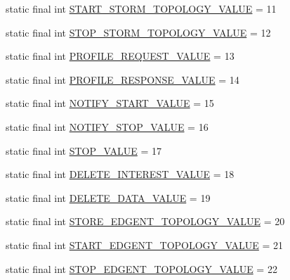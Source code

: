 \begin{DoxyCompactItemize}
\item 
static final int \hyperlink{enumcom_1_1rutgers_1_1Core_1_1Message_1_1ARMessage_1_1Action_a586b51255fd4d3018fc72a7462ea7dc3}{S\+T\+A\+R\+T\+\_\+\+S\+T\+O\+R\+M\+\_\+\+T\+O\+P\+O\+L\+O\+G\+Y\+\_\+\+V\+A\+L\+UE} = 11
\item 
static final int \hyperlink{enumcom_1_1rutgers_1_1Core_1_1Message_1_1ARMessage_1_1Action_a5fefc8467945fc83716e26563ac2d48b}{S\+T\+O\+P\+\_\+\+S\+T\+O\+R\+M\+\_\+\+T\+O\+P\+O\+L\+O\+G\+Y\+\_\+\+V\+A\+L\+UE} = 12
\item 
static final int \hyperlink{enumcom_1_1rutgers_1_1Core_1_1Message_1_1ARMessage_1_1Action_a692f97c90a7315347e5e5744290fd1f8}{P\+R\+O\+F\+I\+L\+E\+\_\+\+R\+E\+Q\+U\+E\+S\+T\+\_\+\+V\+A\+L\+UE} = 13
\item 
static final int \hyperlink{enumcom_1_1rutgers_1_1Core_1_1Message_1_1ARMessage_1_1Action_a22bc9d9e2a9645fd8f49fc117783ea25}{P\+R\+O\+F\+I\+L\+E\+\_\+\+R\+E\+S\+P\+O\+N\+S\+E\+\_\+\+V\+A\+L\+UE} = 14
\item 
static final int \hyperlink{enumcom_1_1rutgers_1_1Core_1_1Message_1_1ARMessage_1_1Action_a85685fc746173f60de211c4262473427}{N\+O\+T\+I\+F\+Y\+\_\+\+S\+T\+A\+R\+T\+\_\+\+V\+A\+L\+UE} = 15
\item 
static final int \hyperlink{enumcom_1_1rutgers_1_1Core_1_1Message_1_1ARMessage_1_1Action_a355b310fc80fe14fea43b52d5271aab9}{N\+O\+T\+I\+F\+Y\+\_\+\+S\+T\+O\+P\+\_\+\+V\+A\+L\+UE} = 16
\item 
static final int \hyperlink{enumcom_1_1rutgers_1_1Core_1_1Message_1_1ARMessage_1_1Action_aa1fe7b3ad2ca3f7d72867e550feb6698}{S\+T\+O\+P\+\_\+\+V\+A\+L\+UE} = 17
\item 
static final int \hyperlink{enumcom_1_1rutgers_1_1Core_1_1Message_1_1ARMessage_1_1Action_adbcf2ca11eecbbf3932c004dc8d2f912}{D\+E\+L\+E\+T\+E\+\_\+\+I\+N\+T\+E\+R\+E\+S\+T\+\_\+\+V\+A\+L\+UE} = 18
\item 
static final int \hyperlink{enumcom_1_1rutgers_1_1Core_1_1Message_1_1ARMessage_1_1Action_a0a7492adcda5758f8db314dea768fae8}{D\+E\+L\+E\+T\+E\+\_\+\+D\+A\+T\+A\+\_\+\+V\+A\+L\+UE} = 19
\item 
static final int \hyperlink{enumcom_1_1rutgers_1_1Core_1_1Message_1_1ARMessage_1_1Action_ab4091e2dd07c1163797913c7f1c16f28}{S\+T\+O\+R\+E\+\_\+\+E\+D\+G\+E\+N\+T\+\_\+\+T\+O\+P\+O\+L\+O\+G\+Y\+\_\+\+V\+A\+L\+UE} = 20
\item 
static final int \hyperlink{enumcom_1_1rutgers_1_1Core_1_1Message_1_1ARMessage_1_1Action_a8d743cfa900cc77760ddb287fbcf00fd}{S\+T\+A\+R\+T\+\_\+\+E\+D\+G\+E\+N\+T\+\_\+\+T\+O\+P\+O\+L\+O\+G\+Y\+\_\+\+V\+A\+L\+UE} = 21
\item 
static final int \hyperlink{enumcom_1_1rutgers_1_1Core_1_1Message_1_1ARMessage_1_1Action_ac60c5616c039a74f3a98e348e0d2156b}{S\+T\+O\+P\+\_\+\+E\+D\+G\+E\+N\+T\+\_\+\+T\+O\+P\+O\+L\+O\+G\+Y\+\_\+\+V\+A\+L\+UE} = 22
\end{DoxyCompactItemize}


